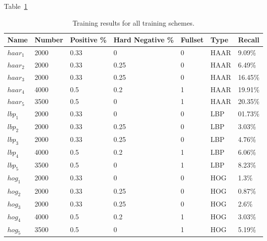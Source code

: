 \documentclass{llncs}
\begin{document}
{		Table~\ref{tab:training_results}

		\begin{table}
			\centering
			\caption{Training results for all training schemes.}
			\label{tab:training_results}
			\begin{tabularx}{\textwidth}{XXllXXX}
				\toprule
				\textbf{Name} & \textbf{Number} & \textbf{Positive \%} & \textbf{Hard Negative \%} & \textbf{Fullset} & \textbf{Type} & \textbf{Recall} \\
				\midrule
					\(haar_1\) & 2000 & 0.33 & 0 & 0 & HAAR & 9.09\% \\
					\(haar_2\) & 2000 & 0.33 & 0.25 & 0 & HAAR & 6.49\% \\
					\(haar_3\) & 2000 & 0.33 & 0.25 & 0 & HAAR & 16.45\% \\
					\(haar_4\) & 4000 & 0.5 & 0.2 & 1 & HAAR & 19.91\% \\
					\(haar_5\) & 3500 & 0.5 & 0 & 1 & HAAR & 20.35\% \\
					\(lbp_1\) & 2000 & 0.33 & 0 & 0 & LBP & 01.73\% \\
					\(lbp_2\) & 2000 & 0.33 & 0.25 & 0 & LBP & 3.03\% \\
					\(lbp_3\) & 2000 & 0.33 & 0.25 & 0 & LBP & 4.76\% \\
					\(lbp_4\) & 4000 & 0.5 & 0.2 & 1 & LBP & 6.06\% \\
					\(lbp_5\) & 3500 & 0.5 & 0 & 1 & LBP & 8.23\% \\
					\(hog_1\) & 2000 & 0.33 & 0 & 0 & HOG & 1.3\% \\
					\(hog_2\) & 2000 & 0.33 & 0.25 & 0 & HOG & 0.87\% \\
					\(hog_3\) & 2000 & 0.33 & 0.25 & 0 & HOG & 2.6\% \\
					\(hog_4\) & 4000 & 0.5 & 0.2 & 1 & HOG & 3.03\% \\
					\(hog_5\) & 3500 & 0.5 & 0 & 1 & HOG & 5.19\% \\
				\bottomrule
			\end{tabularx}
		\end{table}

}
\end{document}
